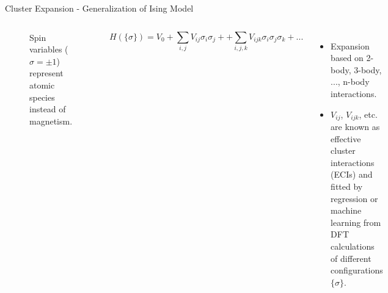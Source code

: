 \documentclass[aspectratio=169]{beamer}
\begin{document}
    \begin{frame}{Cluster Expansion - Generalization of Ising Model}

\begin{columns}
\begin{figure}
            \caption{Spin variables ($\sigma = \pm 1$) represent atomic species instead of magnetism. }
         \end{figure}
\begin{equation*}
            H(\{\sigma\}) = V_0 + \sum_{i,j} V_{ij} \sigma_i \sigma_j + + \sum_{i,j,k} V_{ijk} \sigma_i \sigma_j \sigma_k + ...
        \end{equation*}
                \begin{itemize}
            \item Expansion based on 2-body, 3-body, ..., n-body interactions.
            \item $V_{ij}$, $V_{ijk}$, etc. are known as effective cluster interactions (ECIs) and fitted by regression or machine learning from DFT calculations of different configurations $\{\sigma\}$.
        \end{itemize}

\end{columns}

    \end{frame}
\end{document}
